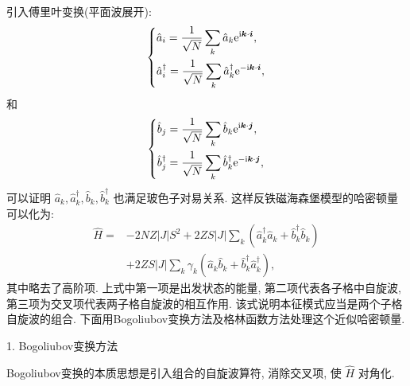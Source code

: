 引入傅里叶变换(平面波展开):
\begin{equation}
\left\{\begin{aligned}
&\hat{a}_{i}=\frac{1}{\sqrt{N}} \sum_{k} \hat{a}_{k} \mathrm{e}^{\mathrm{i} \boldsymbol{k} \cdot \boldsymbol{i}}, \\
&\hat{a}_{i}^{\dagger}=\frac{1}{\sqrt{N}} \sum_{k} \hat{a}_{k}^{\dagger} \mathrm{e}^{-\mathrm{i} \boldsymbol{k} \cdot \boldsymbol{i}},
\end{aligned}\right.
\end{equation}
和
\begin{equation}
\left\{\begin{aligned}
&\hat{b}_{j}=\frac{1}{\sqrt{N}} \sum_{k} \hat{b}_{k} \mathrm{e}^{\mathrm{i} \boldsymbol{k} \cdot \boldsymbol{j}},\\
&\hat{b}_{j}^{\dagger}=\frac{1}{\sqrt{N}} \sum_{k} \hat{b}_{k}^{\dagger} \mathrm{e}^{-\mathrm{i} \boldsymbol{k} \cdot \boldsymbol{j}},
\end{aligned}\right.
\end{equation}
可以证明 $\hat{a}^{}_{k}, \hat{a}_{k}^{\dagger}, \hat{b}^{}_{k}, \hat{b}_{k}^{\dagger}$ 也满足玻色子对易关系. 这样反铁磁海森堡模型的哈密顿量可以化为:
\begin{align}
\hat{H}=&-2 N Z|J| S^{2}+2 Z S|J| \sum_{k}\left(\hat{a}_{k}^{\dagger} \hat{a}^{}_{k}+\hat{b}_{k}^{\dagger} \hat{b}^{}_{k}\right) \nonumber\\
&+2 Z S|J| \sum_{k} \gamma_{k}\left(\hat{a}_{k} \hat{b}_{k}+\hat{b}_{k}^{\dagger} \hat{a}_{k}^{\dagger}\right) ,
\end{align}
其中略去了高阶项. 上式中第一项是出发状态的能量, 第二项代表各子格中自旋波, 第三项为交叉项代表两子格自旋波的相互作用. 该式说明本征模式应当是两个子格自旋波的组合. 下面用Bogoliubov变换方法及格林函数方法处理这个近似哈密顿量.

1. Bogoliubov变换方法

Bogoliubov变换的本质思想是引入组合的自旋波算符, 消除交叉项, 使 $\hat H$ 对角化.

